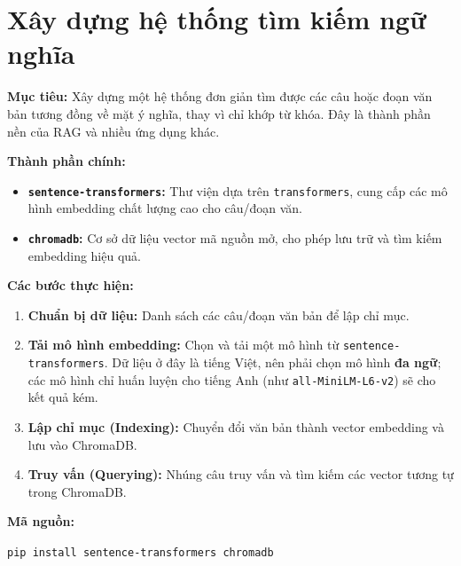 
\section{Xây dựng hệ thống tìm kiếm ngữ nghĩa}
\label{sec:semantic_search}

\textbf{Mục tiêu:} Xây dựng một hệ thống đơn giản tìm được các câu hoặc đoạn văn bản tương đồng về mặt ý nghĩa, thay vì chỉ khớp từ khóa. Đây là thành phần nền của RAG và nhiều ứng dụng khác.

\textbf{Thành phần chính:}
\begin{itemize}
    \item \textbf{\texttt{sentence-\allowbreak transformers}:} Thư viện dựa trên \texttt{transformers}, cung cấp các mô hình embedding chất lượng cao cho câu/đoạn văn.
    \item \textbf{\texttt{chromadb}:} Cơ sở dữ liệu vector mã nguồn mở, cho phép lưu trữ và tìm kiếm embedding hiệu quả.
\end{itemize}

\textbf{Các bước thực hiện:}
\begin{enumerate}
    \item \textbf{Chuẩn bị dữ liệu:} Danh sách các câu/đoạn văn bản để lập chỉ mục.
    \item \textbf{Tải mô hình embedding:} Chọn và tải một mô hình từ \texttt{sentence-\allowbreak transformers}. Dữ liệu ở đây là tiếng Việt, nên phải chọn mô hình \textbf{đa ngữ}; các mô hình chỉ huấn luyện cho tiếng Anh (như \texttt{all-\allowbreak MiniLM-\allowbreak L6-\allowbreak v2}) sẽ cho kết quả kém.
    \item \textbf{Lập chỉ mục (Indexing):} Chuyển đổi văn bản thành vector embedding và lưu vào ChromaDB.
    \item \textbf{Truy vấn (Querying):} Nhúng câu truy vấn và tìm kiếm các vector tương tự trong ChromaDB.
\end{enumerate}

\textbf{Mã nguồn:}

\noindent
\colorbox{gray!20}{\texttt{pip install sentence-transformers chromadb}}

